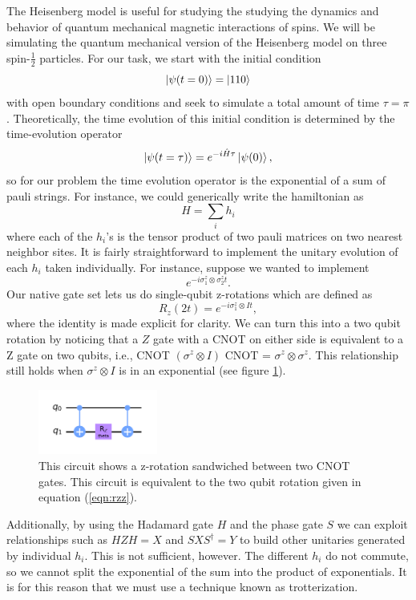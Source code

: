 \documentclass[aps,prl, reprint]{revtex4-2}
\begin{document}
The Heisenberg model is useful for studying the studying the dynamics and behavior of quantum mechanical magnetic interactions of spins. We will be simulating the quantum mechanical version of the Heisenberg model on three spin-$\frac{1}{2}$ particles. For our task, we start with the initial condition
\begin{equation}
\ket{\psi(t=0)} = \ket{110}
\end{equation}
with open boundary conditions and seek to simulate a total amount of time $\tau = \pi$. Theoretically, the time evolution of this initial condition is determined by the time-evolution operator
\begin{equation}
\ket{\psi(t=\tau)} = e^{-i \hat{H} \tau}\ket{\psi(0)},
\end{equation}
so for our problem the time evolution operator is the exponential of a sum of pauli strings. For instance, we could generically write the hamiltonian as
\begin{equation}
H = \sum_i h_i
\end{equation}
where each of the $h_i$'s is the tensor product of two pauli matrices on two nearest neighbor sites. It is fairly straightforward to implement the unitary evolution of each $h_i$ taken individually. For instance, suppose we wanted to implement
\begin{equation}
e^{-i \sigma^{z}_1 \otimes \sigma^{z}_2 t}.
\label{eqn:rzz}
\end{equation}
Our native gate set lets us do single-qubit z-rotations which are defined as
\begin{equation}
R_{z}(2t)=e^{-i \sigma^{z}_1 \otimes I t },
\end{equation}
where the identity is made explicit for clarity. We can turn this into a two qubit rotation by noticing that a $Z$ gate with a CNOT on either side is equivalent to a Z gate on two qubits, i.e., CNOT $(\sigma^{z} \otimes I)$ CNOT = $\sigma^{z} \otimes \sigma^{z}$. This relationship still holds when $\sigma^{z} \otimes I$ is in an exponential (see figure \ref{fig:rzz}). 
\begin{figure}
\includegraphics[width=0.35\textwidth]{Rzz.png}
\caption{This circuit shows a z-rotation sandwiched between two CNOT gates. This circuit is equivalent to the two qubit rotation given in equation (\ref{eqn:rzz}).}
\label{fig:rzz}
\end{figure}
Additionally, by using the Hadamard gate $H$ and the phase gate $S$ we can exploit relationships such as $HZH = X$ and $S X S^{\dagger}=Y$ to build other unitaries generated by individual $h_i$. This is not sufficient, however. The different $h_i$ do not commute, so we cannot split the exponential of the sum into the product of exponentials. It is for this reason that we must use a technique known as trotterization.
\end{document}
